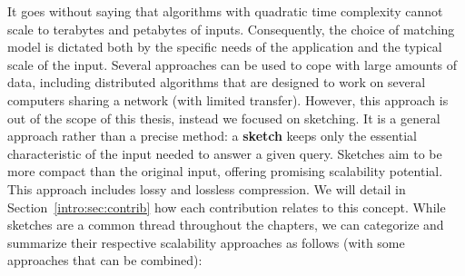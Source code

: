 %
It goes without saying that algorithms with quadratic time complexity cannot scale to terabytes and petabytes of inputs. Consequently, the choice of matching model is dictated both by the specific needs of the application and the typical scale of the input.
%
Several approaches can be used to cope with large amounts of data, including distributed algorithms that are designed to work on several computers sharing a network (with limited transfer). However, this approach is out of the scope of this thesis, instead we focused on sketching. It is a general approach rather than a precise method: a \textbf{sketch} keeps only the essential characteristic of the input needed to answer a given query. 
Sketches aim to be more compact than the original input, offering promising scalability potential. This approach includes lossy and lossless compression. We will detail in Section~\ref{intro:sec:contrib} how each contribution relates to this concept. 
While sketches are a common thread throughout the chapters, we can categorize and summarize their respective scalability approaches as follows (with some approaches that can be combined): 

